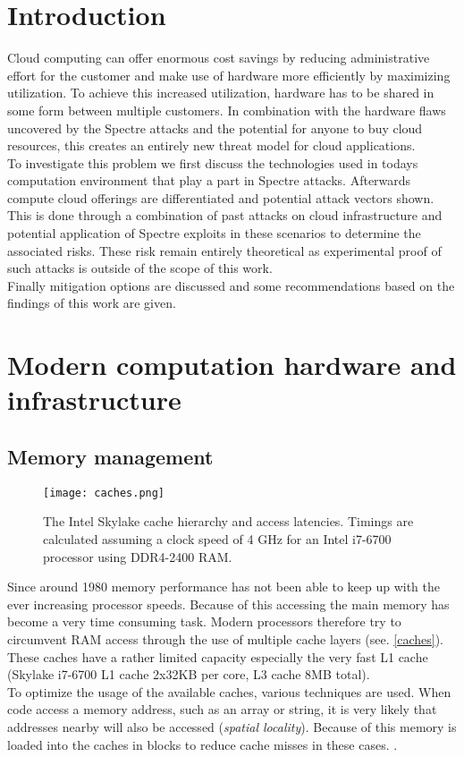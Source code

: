 \documentclass[conference,compsoc,final,a4paper]{IEEEtran}
\begin{document}
\section{Introduction}
Cloud computing can offer enormous cost savings by reducing administrative effort for the customer and make use of hardware more efficiently by maximizing utilization. To achieve this increased utilization, hardware has to be shared in some form between multiple customers. In combination with the hardware flaws uncovered by the Spectre attacks and the potential for anyone to buy cloud resources, this creates an entirely new threat model for cloud applications. \\
To investigate this problem we first discuss the technologies used in todays computation environment that play a part in Spectre attacks. Afterwards compute cloud offerings are differentiated and potential attack vectors shown. This is done through a combination of past attacks on cloud infrastructure and potential application of Spectre exploits in these scenarios to determine the associated risks. These risk remain entirely theoretical as experimental proof of such attacks is outside of the scope of this work. \\
Finally mitigation options are discussed and some recommendations based on the findings of this work are given.

\section{Modern computation hardware and infrastructure}
\subsection{Memory management}
\begin{figure}[!ht]
\centering
\texttt{[image: caches.png]}
\caption{The Intel Skylake cache hierarchy and access latencies\cite{fog2012microarchitecture}. Timings are calculated assuming a clock speed of 4 GHz for an Intel i7-6700 processor using DDR4-2400 RAM\cite{skylakeBenchmark}. }
\label{caches}
\end{figure}
Since around 1980 memory performance has not been able to keep up with the ever increasing processor speeds. \cite[p.~73]{hennessy2011computer} Because of this accessing the main memory has become a very time consuming task. Modern processors therefore try to circumvent RAM access through the use of multiple cache layers (see. \autoref{caches}). These caches have a rather limited capacity especially the very fast L1 cache (Skylake i7-6700 L1 cache 2x32KB per core, L3 cache 8MB total). \cite{skylakeBenchmark} \\
To optimize the usage of the available caches, various techniques are used. When code access a memory address, such as an array or string, it is very likely that addresses nearby will also be accessed (\emph{spatial locality}). Because of this memory is loaded into the caches in blocks to reduce cache misses in these cases. \cite[p.~74]{hennessy2011computer}. \\
\end{document}
